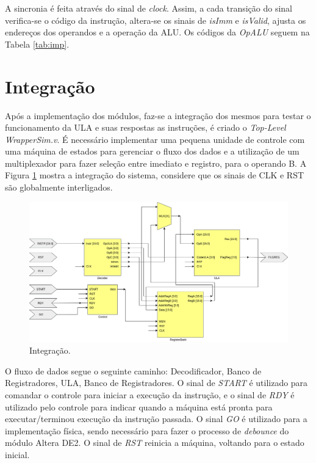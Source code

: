 \documentclass[11pt,a4paper,titlepage]{article}
\begin{document}
A sincronia é feita através do sinal de \textit{clock}. Assim, a cada transição do sinal verifica-se o código da instrução, altera-se os sinais de \textit{isImm} e \textit{isValid}, ajusta os endereços dos operandos e a operação da ALU. Os códigos da \textit{OpALU} seguem na Tabela \ref{tab:imp}.

\section{Integração}

Após a implementação dos módulos, faz-se a integração dos mesmos para testar o funcionamento da ULA e suas respostas as instruções, é criado o \textit{Top-Level WrapperSim.v}. É necessário implementar uma pequena unidade de controle com uma máquina de estados para gerenciar o fluxo dos dados e a utilização de um multiplexador para fazer seleção entre imediato e registro, para o operando B. A Figura \ref{fig:blocomicro} mostra a integração do sistema, considere que os sinais de CLK e RST são globalmente interligados.

\begin{figure}[h]
\centering
\includegraphics[scale=0.4]{images/Microprocessor.png}
\caption{Integração.}
\label{fig:blocomicro}
\end{figure}

O fluxo de dados segue o seguinte caminho: Decodificador, Banco de Registradores, ULA, Banco de Registradores. O sinal de \textit{START} é utilizado para comandar o controle para iniciar a execução da instrução, e o sinal de \textit{RDY} é utilizado pelo controle para indicar quando a máquina está pronta para executar/terminou execução da instrução passada. O sinal \textit{GO} é utilizado para a implementação física, sendo necessário para fazer o processo de \textit{debounce} do módulo Altera DE2. O sinal de \textit{RST} reinicia a máquina, voltando para o estado inicial.
\end{document}

